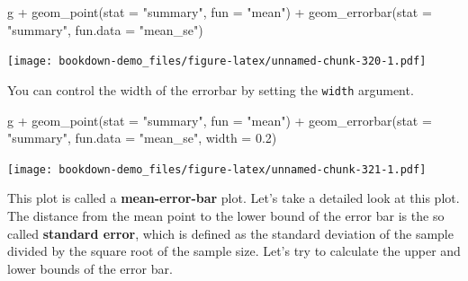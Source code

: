 \documentclass[
]{book}
\newenvironment{Shaded}{\begin{snugshade}}{\end{snugshade}}
\newcommand{\AttributeTok}[1]{\textcolor[rgb]{0.77,0.63,0.00}{#1}}
\newcommand{\FloatTok}[1]{\textcolor[rgb]{0.00,0.00,0.81}{#1}}
\newcommand{\FunctionTok}[1]{\textcolor[rgb]{0.00,0.00,0.00}{#1}}
\newcommand{\NormalTok}[1]{#1}
\newcommand{\OtherTok}[1]{\textcolor[rgb]{0.56,0.35,0.01}{#1}}
\newcommand{\SpecialCharTok}[1]{\textcolor[rgb]{0.00,0.00,0.00}{#1}}
\newcommand{\StringTok}[1]{\textcolor[rgb]{0.31,0.60,0.02}{#1}}
\begin{document}
\begin{Shaded}
\begin{Highlighting}[]
\NormalTok{g  }\SpecialCharTok{+} \FunctionTok{geom\_point}\NormalTok{(}\AttributeTok{stat =} \StringTok{"summary"}\NormalTok{, }\AttributeTok{fun =} \StringTok{"mean"}\NormalTok{) }\SpecialCharTok{+} 
  \FunctionTok{geom\_errorbar}\NormalTok{(}\AttributeTok{stat =} \StringTok{"summary"}\NormalTok{, }\AttributeTok{fun.data =} \StringTok{"mean\_se"}\NormalTok{) }
\end{Highlighting}
\end{Shaded}

\texttt{[image: bookdown-demo\_files/figure-latex/unnamed-chunk-320-1.pdf]}

You can control the width of the errorbar by setting the \texttt{width} argument.

\begin{Shaded}
\begin{Highlighting}[]
\NormalTok{g  }\SpecialCharTok{+} \FunctionTok{geom\_point}\NormalTok{(}\AttributeTok{stat =} \StringTok{"summary"}\NormalTok{, }\AttributeTok{fun =} \StringTok{"mean"}\NormalTok{) }\SpecialCharTok{+} 
  \FunctionTok{geom\_errorbar}\NormalTok{(}\AttributeTok{stat =} \StringTok{"summary"}\NormalTok{, }\AttributeTok{fun.data =} \StringTok{"mean\_se"}\NormalTok{, }\AttributeTok{width =} \FloatTok{0.2}\NormalTok{)}
\end{Highlighting}
\end{Shaded}

\texttt{[image: bookdown-demo\_files/figure-latex/unnamed-chunk-321-1.pdf]}

This plot is called a \textbf{mean-error-bar} plot. Let's take a detailed look at this plot. The distance from the mean point to the lower bound of the error bar is the so called \textbf{standard error}, which is defined as the standard deviation of the sample divided by the square root of the sample size. Let's try to calculate the upper and lower bounds of the error bar.

\begin{Shaded}
\end{Shaded}
\end{document}
